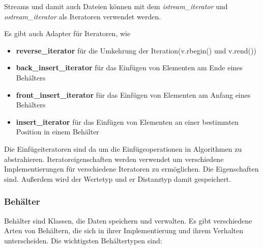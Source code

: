 \documentclass[12pt]{scrartcl}
\begin{document}
Streams und damit auch Dateien können mit dem \emph{istream\_iterator} und
\emph{ostream\_iterator} als Iteratoren verwendet werden.

Es gibt auch Adapter für Iteratoren, wie
\begin{itemize}
	\item \textbf{reverse\_iterator} für die Umkehrung der Iteration(v.rbegin() und v.rend())
	\item \textbf{back\_insert\_iterator} für das Einfügen von Elementen am Ende eines Behälters
	\item \textbf{front\_insert\_iterator} für das Einfügen von Elementen am Anfang eines Behälters
	\item \textbf{insert\_iterator} für das Einfügen von Elementen an einer bestimmten Position in einem Behälter
\end{itemize}

Die Einfügeiteratoren sind da um die Einfügeoperationen in Algorithmen zu abstrahieren.
\linebreak
Iteratoreigenschaften werden verwendet um verschiedene Implementierungen für verschiedene Iteratoren zu ermöglichen.
Die Eigenschaften sind. Außerdem wird der Wertetyp und er Distanztyp damit gespeichert.

\subsubsection{Behälter}
Behälter sind Klassen, die Daten speichern und verwalten. Es gibt verschiedene Arten von Behältern, die sich in ihrer
Implementierung und ihrem Verhalten unterscheiden. Die wichtigsten Behältertypen sind:
\end{document}
